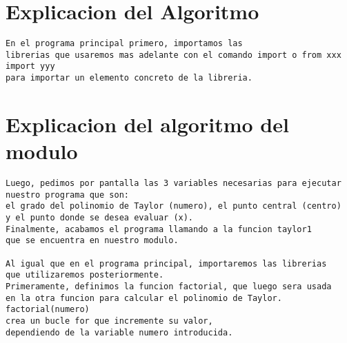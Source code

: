 \section{Explicacion del Algoritmo}
\label{Apendice2:label}

\begin{center}
\begin{footnotesize}
\begin{verbatim}
En el programa principal primero, importamos las 
librerias que usaremos mas adelante con el comando import o from xxx import yyy 
para importar un elemento concreto de la libreria.
\end{verbatim}
\end{footnotesize}
\end{center}

\section{Explicacion del algoritmo del modulo}
\label{Apendice2:label2}

\begin{center}
\begin{footnotesize}
\begin{verbatim}
Luego, pedimos por pantalla las 3 variables necesarias para ejecutar nuestro programa que son:
el grado del polinomio de Taylor (numero), el punto central (centro) 
y el punto donde se desea evaluar (x). 
Finalmente, acabamos el programa llamando a la funcion taylor1 
que se encuentra en nuestro modulo.

Al igual que en el programa principal, importaremos las librerias 
que utilizaremos posteriormente. 
Primeramente, definimos la funcion factorial, que luego sera usada 
en la otra funcion para calcular el polinomio de Taylor. factorial(numero) 
crea un bucle for que incremente su valor, 
dependiendo de la variable numero introducida.
 
\end{verbatim}
\end{footnotesize}
\end{center}


